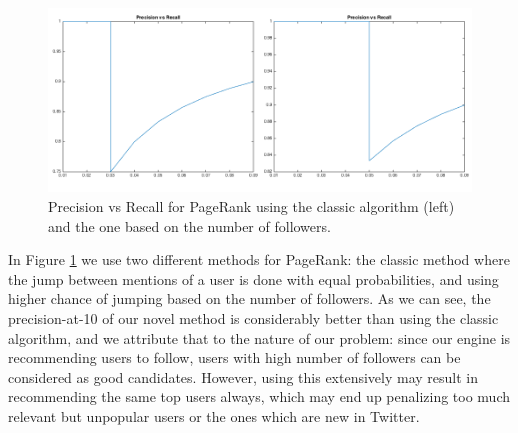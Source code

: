\begin{figure}[H]
\centering
\includegraphics[width=5.5in,natwidth=966,natheight=420]{images/exptopr.png}
\caption{Precision vs Recall for PageRank using the classic algorithm (left) and the one based on the number of followers.}
\label{fig:exptopr}
\end{figure}

In Figure \ref{fig:exptopr} we use two different methods for PageRank: the
classic method where the jump between mentions of a user is done with equal
probabilities, and using higher chance of jumping based on the number of
followers. As we can see, the precision-at-10 of our novel method is
considerably better than using the classic algorithm, and we attribute that to
the nature of our problem: since our engine is recommending users to follow,
users with high number of followers can be considered as good candidates.
However, using this extensively may result in recommending the same top users
always, which may end up penalizing too much relevant but unpopular users or the
ones which are new in Twitter.
